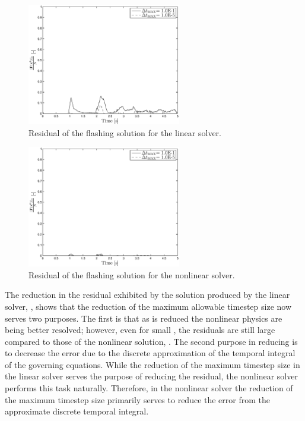 \begin{figure}[h!tb]
\centering
\includegraphics[width=0.6\textwidth]{plots/lin_flashing_res_compare.eps}
\caption{Residual of the flashing solution for the linear solver.}
\label{fig:linear_flashing_residual}
\end{figure}

\begin{figure}[h!tb]
\centering
\includegraphics[width=0.6\textwidth]{plots/nln_flashing_res_compare.eps}
\caption{Residual of the flashing solution for the nonlinear solver.}
\label{fig:nonlinear_flashing_residual}
\end{figure}

The reduction in the residual exhibited by the solution produced by the linear solver, , shows that the reduction of the maximum allowable timestep size now serves two purposes.
The first is that as \dtmax{} is reduced the nonlinear physics are being better resolved; however, even for small \dtmax{}, the residuals are still large compared to those of the nonlinear solution, .
The second purpose in reducing \dtmax{} is to decrease the error due to the discrete approximation of the temporal integral of the governing equations.
While the reduction of the maximum timestep size in the linear solver serves the purpose of reducing the residual, the nonlinear solver performs this task naturally.
Therefore, in the nonlinear solver the reduction of the maximum timestep size primarily serves to reduce the error from the approximate discrete temporal integral.

